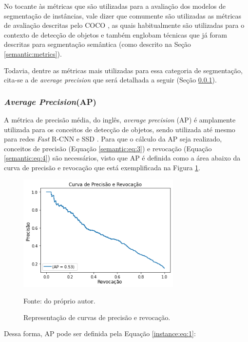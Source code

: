 No tocante às métricas que são utilizadas para a avaliação dos modelos de segmentação de instâncias, vale dizer que comumente são utilizadas as métricas de avaliação descritas pelo COCO \cite{Lin2016}, as quais habitualmente são utilizadas para o contexto de detecção de objetos e também englobam técnicas que já foram descritas para segmentação semântica (como descrito na Seção \ref{semantic:metrics}).

Todavia, dentre as métricas mais utilizadas para essa categoria de segmentação, cita-se a de \textit{average precision} que será detalhada a seguir (Seção \ref{instance:AP}).


\subsubsection{\textit{Average Precision}(AP)}
\label{instance:AP}

A métrica de precisão média, do inglês, \textit{average precision} (AP) é amplamente utilizada para os conceitos de detecção de objetos, sendo utilizada até mesmo para redes \textit{Fast} R-CNN \cite{Girshick2014} e SSD \cite{Liu2015a}. Para que o cálculo da AP seja realizado, conceitos de precisão (Equação \ref{semantic:eq:3}) e revocação (Equação \ref{semantic:eq:4}) são necessários, visto que AP é definida como a área abaixo da curva de precisão e revocação \cite{Hariharan2014} que está exemplificada na Figura \ref{instance:fig:1}.

\begin{figure}[H]
    \centering
    \caption{Representação de curvas de precisão e revocação.}
    \includegraphics[height=2.3in]{recursos/imagens/instance/precisao_revocacao.png}
    \label{instance:fig:1}

    \vspace*{1 cm}
    Fonte: do próprio autor.
\end{figure}

Dessa forma, AP pode ser definida pela Equação \ref{instance:eq:1}:

